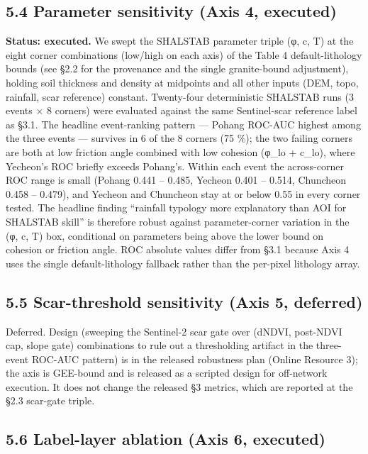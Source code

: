 \documentclass[11pt,a4paper]{article}
\begin{document}
\subsection{\texorpdfstring{5.4 Parameter sensitivity (Axis 4, \textbf{executed})}{5.4 Parameter sensitivity (Axis 4, executed)}}\label{parameter-sensitivity-axis-4-executed}

\textbf{Status: executed.} We swept the SHALSTAB parameter triple (φ, c, T) at the eight corner combinations (low/high on each axis) of the Table 4 default-lithology bounds (see §2.2 for the provenance and the single granite-bound adjustment), holding soil thickness and density at midpoints and all other inputs (DEM, topo, rainfall, scar reference) constant. Twenty-four deterministic SHALSTAB runs (3 events × 8 corners) were evaluated against the same Sentinel-scar reference label as §3.1. The headline event-ranking pattern --- Pohang ROC-AUC highest among the three events --- survives in 6 of the 8 corners (75 \%); the two failing corners are both at low friction angle combined with low cohesion (φ\_lo + c\_lo), where Yecheon's ROC briefly exceeds Pohang's. Within each event the across-corner ROC range is small (Pohang 0.441 -- 0.485, Yecheon 0.401 -- 0.514, Chuncheon 0.458 -- 0.479), and Yecheon and Chuncheon stay at or below 0.55 in every corner tested. The headline finding ``rainfall typology more explanatory than AOI for SHALSTAB skill'' is therefore robust against parameter-corner variation in the (φ, c, T) box, conditional on parameters being above the lower bound on cohesion or friction angle. ROC absolute values differ from §3.1 because Axis 4 uses the single default-lithology fallback rather than the per-pixel lithology array.

\subsection{5.5 Scar-threshold sensitivity (Axis 5, deferred)}\label{scar-threshold-sensitivity-axis-5-deferred}

Deferred. Design (sweeping the Sentinel-2 scar gate over (dNDVI, post-NDVI cap, slope gate) combinations to rule out a thresholding artifact in the three-event ROC-AUC pattern) is in the released robustness plan (Online Resource 3); the axis is GEE-bound and is released as a scripted design for off-network execution. It does not change the released §3 metrics, which are reported at the §2.3 scar-gate triple.

\subsection{\texorpdfstring{5.6 Label-layer ablation (Axis 6, \textbf{executed})}{5.6 Label-layer ablation (Axis 6, executed)}}\label{label-layer-ablation-axis-6-executed}
\end{document}

